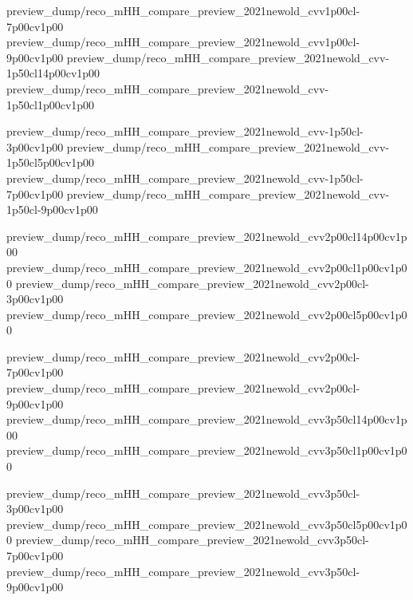 {preview_dump/reco_mHH_compare_preview_2021newold_cvv1p00cl-7p00cv1p00}
{preview_dump/reco_mHH_compare_preview_2021newold_cvv1p00cl-9p00cv1p00}
{preview_dump/reco_mHH_compare_preview_2021newold_cvv-1p50cl14p00cv1p00}
{preview_dump/reco_mHH_compare_preview_2021newold_cvv-1p50cl1p00cv1p00}

{preview_dump/reco_mHH_compare_preview_2021newold_cvv-1p50cl-3p00cv1p00}
{preview_dump/reco_mHH_compare_preview_2021newold_cvv-1p50cl5p00cv1p00}
{preview_dump/reco_mHH_compare_preview_2021newold_cvv-1p50cl-7p00cv1p00}
{preview_dump/reco_mHH_compare_preview_2021newold_cvv-1p50cl-9p00cv1p00}

{preview_dump/reco_mHH_compare_preview_2021newold_cvv2p00cl14p00cv1p00}
{preview_dump/reco_mHH_compare_preview_2021newold_cvv2p00cl1p00cv1p00}
{preview_dump/reco_mHH_compare_preview_2021newold_cvv2p00cl-3p00cv1p00}
{preview_dump/reco_mHH_compare_preview_2021newold_cvv2p00cl5p00cv1p00}

{preview_dump/reco_mHH_compare_preview_2021newold_cvv2p00cl-7p00cv1p00}
{preview_dump/reco_mHH_compare_preview_2021newold_cvv2p00cl-9p00cv1p00}
{preview_dump/reco_mHH_compare_preview_2021newold_cvv3p50cl14p00cv1p00}
{preview_dump/reco_mHH_compare_preview_2021newold_cvv3p50cl1p00cv1p00}

{preview_dump/reco_mHH_compare_preview_2021newold_cvv3p50cl-3p00cv1p00}
{preview_dump/reco_mHH_compare_preview_2021newold_cvv3p50cl5p00cv1p00}
{preview_dump/reco_mHH_compare_preview_2021newold_cvv3p50cl-7p00cv1p00}
{preview_dump/reco_mHH_compare_preview_2021newold_cvv3p50cl-9p00cv1p00}

